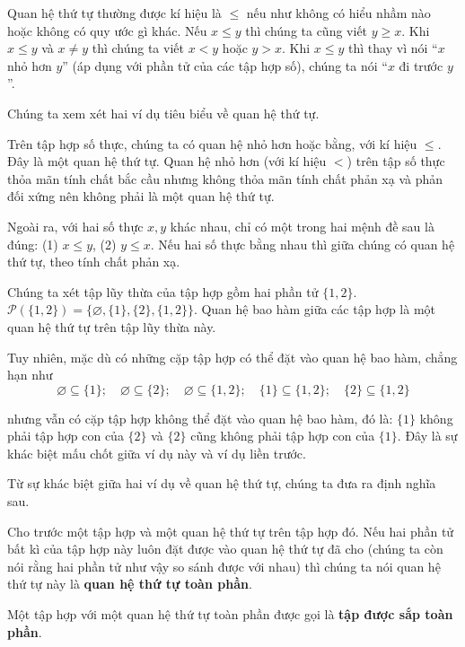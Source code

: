 Quan hệ thứ tự thường được kí hiệu là $\leq$ nếu như không có hiểu nhầm nào hoặc không có quy ước gì khác. Nếu $x\leq y$ thì chúng ta cũng viết $y\geq x$. Khi $x\leq y$ và $x\ne y$ thì chúng ta viết $x < y$ hoặc $y > x$. Khi $x\leq y$ thì thay vì nói ``$x$ nhỏ hơn $y$'' (áp dụng với phần tử của các tập hợp số), chúng ta nói ``$x$ đi trước $y$''.

Chúng ta xem xét hai ví dụ tiêu biểu về quan hệ thứ tự.
\begin{example}
    Trên tập hợp số thực, chúng ta có quan hệ nhỏ hơn hoặc bằng, với kí hiệu $\leq$. Đây là một quan hệ thứ tự. Quan hệ nhỏ hơn (với kí hiệu $<$) trên tập số thực thỏa mãn tính chất bắc cầu nhưng không thỏa mãn tính chất phản xạ và phản đối xứng nên không phải là một quan hệ thứ tự.

    Ngoài ra, với hai số thực $x, y$ khác nhau, chỉ có một trong hai mệnh đề sau là đúng: (1) $x\leq y$, (2) $y\leq x$. Nếu hai số thực bằng nhau thì giữa chúng có quan hệ thứ tự, theo tính chất phản xạ.
\end{example}

\begin{example}
    Chúng ta xét tập lũy thừa của tập hợp gồm hai phần tử $\{ 1, 2 \}$. $\mathcal{P}(\{ 1, 2 \}) = \{ \varnothing, \{ 1 \}, \{ 2 \}, \{ 1, 2 \} \}$. Quan hệ bao hàm giữa các tập hợp là một quan hệ thứ tự trên tập lũy thừa này.

    Tuy nhiên, mặc dù có những cặp tập hợp có thể đặt vào quan hệ bao hàm, chẳng hạn như
    \[
        \varnothing\subseteq \{ 1 \};\quad \varnothing\subseteq \{ 2 \};\quad \varnothing\subseteq\{ 1, 2 \};\quad \{ 1 \}\subseteq\{ 1, 2 \};\quad \{ 2 \}\subseteq\{ 1, 2 \}
    \]

    nhưng vẫn có cặp tập hợp không thể đặt vào quan hệ bao hàm, đó là: $\{ 1 \}$ không phải tập hợp con của $\{ 2 \}$ và $\{ 2 \}$ cũng không phải tập hợp con của $\{ 1 \}$. Đây là sự khác biệt mấu chốt giữa ví dụ này và ví dụ liền trước.
\end{example}

Từ sự khác biệt giữa hai ví dụ về quan hệ thứ tự, chúng ta đưa ra định nghĩa sau.
\begin{definition}
    Cho trước một tập hợp và một quan hệ thứ tự trên tập hợp đó. Nếu hai phần tử bất kì của tập hợp này luôn đặt được vào quan hệ thứ tự đã cho (chúng ta còn nói rằng hai phần tử như vậy so sánh được với nhau) thì chúng ta nói quan hệ thứ tự này là \textbf{quan hệ thứ tự toàn phần}.

    \noindent Một tập hợp với một quan hệ thứ tự toàn phần được gọi là \textbf{tập được sắp toàn phần}.
\end{definition}

